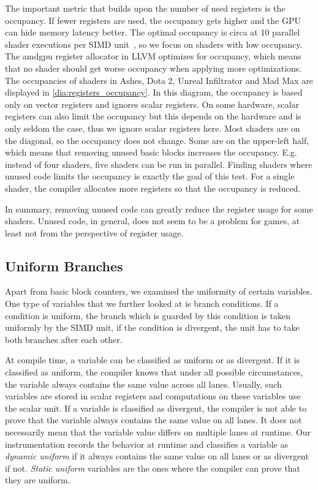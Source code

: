 The important metric that builds upon the number of used registers is the occupancy.
If fewer registers are used, the occupancy gets higher and the GPU can hide memory latency better.
The optimal occupancy is circa at 10 parallel shader executions per SIMD unit~\cite{Aaltonen2017}, so we focus on shaders with low occupancy.
The amdgpu register allocator in LLVM optimizes for occupancy, which means that no shader should get worse occupancy when applying more optimizations.
The occupancies of shaders in Ashes, Dota 2, Unreal Infiltrator and Mad Max are displayed in \cref{dia:registers_occupancy}.
In this diagram, the occupancy is based only on vector registers and ignores scalar registers.
On some hardware, scalar registers can also limit the occupancy but this depends on the hardware and is only seldom the case, thus we ignore scalar registers here.
Most shaders are on the diagonal, so the occupancy does not change.
Some are on the upper-left half, which means that removing unused basic blocks increases the occupancy.
E.g. instead of four shaders, five shaders can be run in parallel.
Finding shaders where unused code limits the occupancy is exactly the goal of this test.
For a single shader, the compiler allocates more registers so that the occupancy is reduced.


In summary, removing unused code can greatly reduce the register usage for some shaders.
Unused code, in general, does not seem to be a problem for games, at least not from the perspective of register usage.

\subsection{Uniform Branches}
\label{sub:eval_uniform_branches}
Apart from basic block counters, we examined the uniformity of certain variables.
One type of variables that we further looked at is branch conditions.
If a condition is uniform, the branch which is guarded by this condition is taken uniformly by the SIMD unit, if the condition is divergent, the unit has to take both branches after each other.

At compile time, a variable can be classified as uniform or as divergent.
If it is classified as uniform, the compiler knows that under all possible circumstances, the variable always contains the same value across all lanes.
Usually, such variables are stored in scalar registers and computations on these variables use the scalar unit.
If a variable is classified as divergent, the compiler is not able to prove that the variable always contains the same value on all lanes.
It does not necessarily mean that the variable value differs on multiple lanes at runtime.
Our instrumentation records the behavior at runtime and classifies a variable as \emph{dynamic uniform} if it always contains the same value on all lanes or as divergent if not.
\emph{Static uniform} variables are the ones where the compiler can prove that they are uniform.

